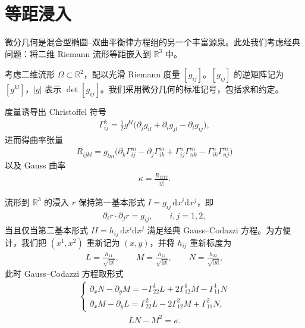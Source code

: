 \documentclass[../../main.tex]{subfiles}
\begin{document}
\section{等距浸入}\label{section:ch18-等距浸入}

微分几何是混合型椭圆--双曲平衡律方程组的另一个丰富源泉。此处我们考虑经典问题：将二维 Riemann 流形等距嵌入到 $\mathbb{R}^3$ 中。

考虑二维流形 $\Omega\subset\mathbb{R}^2$，配以光滑 Riemann 度量 $[g_{ij}]$。$[g_{ij}]$ 的逆矩阵记为 $[g^{kl}]$，$|g|$ 表示 $\det[g_{ij}]$。我们采用微分几何的标准记号，包括求和约定。

度量诱导出 Christoffel 符号
\begin{align}
\Gamma_{ij}^k=\frac12 g^{kl}\bigl(\partial_j g_{il}+\partial_i g_{jl}-\partial_l g_{ij}\bigr),
\label{align:ch18-1871}
\end{align}
进而得曲率张量
\begin{align}
R_{ijkl}=g_{lm}\bigl(\partial_k\Gamma_{ij}^m-\partial_j\Gamma_{ik}^m+\Gamma_{ij}^n\Gamma_{nk}^m-\Gamma_{ik}^n\Gamma_{nj}^m\bigr)
\label{align:ch18-1872}
\end{align}
以及 Gauss 曲率
\begin{align}
\kappa=\frac{R_{1212}}{|g|}.
\label{align:ch18-1873}
\end{align}

流形到 $\mathbb{R}^3$ 的浸入 $r$ 保持第一基本形式 $I=g_{ij}\,\mathrm{d}x^i\mathrm{d}x^j$，即
\begin{align}
\partial_i r\cdot\partial_j r=g_{ij},\qquad i,j=1,2,
\label{align:ch18-1874}
\end{align}
当且仅当第二基本形式 $II=h_{ij}\,\mathrm{d}x^i\mathrm{d}x^j$ 满足经典 Gauss--Codazzi 方程。为方便计，我们把 $(x^1,x^2)$ 重新记为 $(x,y)$，并将 $h_{ij}$ 重新标度为
\begin{align}
L=\frac{h_{11}}{\sqrt{|g|}},\qquad M=\frac{h_{12}}{\sqrt{|g|}},\qquad N=\frac{h_{22}}{\sqrt{|g|}},
\label{align:ch18-1875}
\end{align}
此时 Gauss--Codazzi 方程取形式
\begin{align}
\begin{cases}
\partial_x N-\partial_y M=-\Gamma_{22}^1 L+2\Gamma_{12}^1 M-\Gamma_{11}^1 N\\
\partial_x M-\partial_y L=\Gamma_{22}^2 L-2\Gamma_{12}^2 M+\Gamma_{11}^2 N,
\end{cases}
\label{align:ch18-1876}
\end{align}
\begin{align}
LN-M^2=\kappa.
\label{align:ch18-1877}
\end{align}
\end{document}
